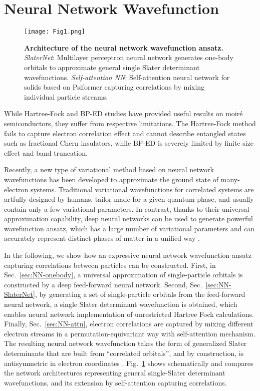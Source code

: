 \documentclass[
 reprint,
 amsmath,amssymb,
 aps, prx,
floatfix,longbibliography,
]{revtex4-2}
\begin{document}
\section{Neural Network Wavefunction}
\label{sec:NN}

\begin{figure}
    \centering
    \texttt{[image: Fig1.png]}
    \caption{\textbf{Architecture of the neural network wavefunction ansatz.} {\em SlaterNet}: Multilayer perceptron neural network generates one-body orbitals to approximate general single Slater determinant wavefunctions. {\em Self-attention NN}: Self-attention neural network for solids based on Psiformer \cite{vonGlehn2022Nov} capturing correlations by mixing individual particle streams.}
    \label{fig:1}
\end{figure}

While Hartree-Fock and BP-ED studies have provided useful results on moir\'e semiconductors, they suffer from respective limitations. The Hartree-Fock method fails to capture electron correlation effect and cannot describe entangled states such as fractional Chern insulators, while BP-ED is severely limited by finite size effect and band truncation. 

Recently, a new type of variational method based on neural network wavefunctions has been developed to approximate the ground state of many-electron systems. Traditional variational wavefunctions for correlated systems are artfully designed by humans, tailor made for a given quantum phase, and usually contain only a few variational parameters. In contrast, thanks to their universal approximation capability, deep neural networks can be used to generate powerful wavefunction ansatz, which has a large number of variational parameters and can accurately represent distinct phases of matter in a unified way \cite{Hornik1989Jan,Pfau2020Sep,Kim2024MayAttentionToComplexity}. 


In the following, we show how an expressive neural network wavefunction ansatz capturing correlations between particles can be constructed. 
First, in Sec.~\ref{sec:NN-onebody}, a universal approximation of single-particle orbitals is constructed by a deep feed-forward neural network. 
Second, Sec.~\ref{sec:NN-SlaterNet}, by generating a set of single-particle orbitals from the feed-forward neural network, a single Slater determinant wavefunction is obtained, which enables neural network implementation of unrestricted Hartree Fock calculations. 
Finally, Sec.~\ref{sec:NN-attn}, electron correlations are captured by mixing different electron streams in a permutation-equivariant way with self-attention mechanism. 
The resulting neural network wavefunction takes the form of generalized Slater determinants that are built from ``correlated orbitals'', and by construction, is antisymmetric in electron coordinates \cite{Pfau2020Sep}.
Fig.~\ref{fig:1} shows schematically and compares the network architectures representing general single-Slater determinant wavefunctions, and its extension by self-attention capturing correlations. 
\end{document}
